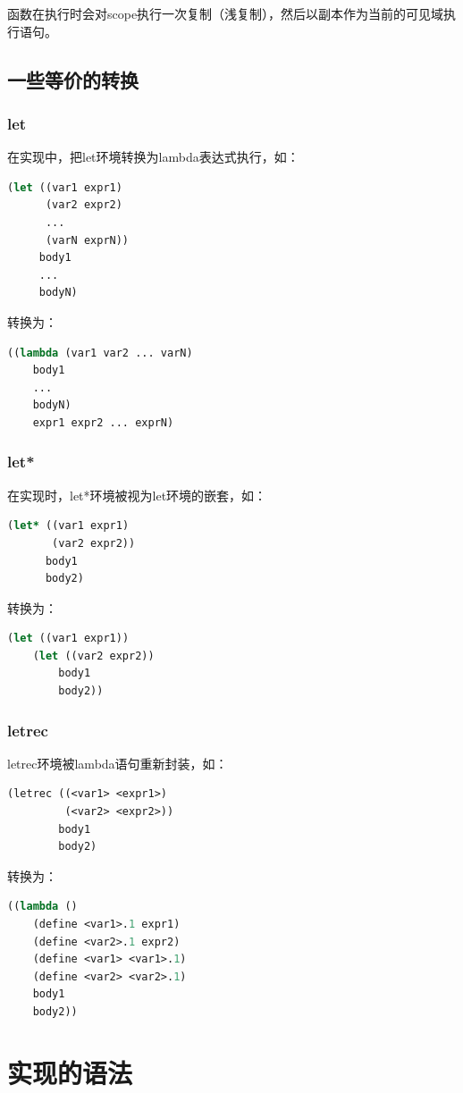 \documentclass[11pt, a4paper]{article}
\begin{document}
			函数在执行时会对scope执行一次复制（浅复制），然后以副本作为当前的可见域执行语句。
		\subsection{一些等价的转换}
			\subsubsection{let}
				在实现中，把let环境转换为lambda表达式执行，如：
\begin{lstlisting}[language=lisp]
(let ((var1 expr1)
      (var2 expr2)
      ...
      (varN exprN))
     body1
     ...
     bodyN)
\end{lstlisting}
转换为：
\begin{lstlisting}[language=lisp]
((lambda (var1 var2 ... varN)
	body1
	...
	bodyN)
	expr1 expr2 ... exprN)
\end{lstlisting}

			\subsubsection{let*}
				在实现时，let*环境被视为let环境的嵌套，如：
\begin{lstlisting}[language=lisp]
(let* ((var1 expr1)
       (var2 expr2))
      body1
      body2)
\end{lstlisting}
转换为：
\begin{lstlisting}[language=lisp]
(let ((var1 expr1))
	(let ((var2 expr2))
		body1
		body2))
\end{lstlisting}

			\subsubsection{letrec}
				letrec环境被lambda语句重新封装，如：
\begin{lstlisting}[language=lisp]
(letrec ((<var1> <expr1>)
         (<var2> <expr2>))
		body1
		body2)
\end{lstlisting}
转换为：
\begin{lstlisting}[language=lisp]
((lambda ()
	(define <var1>.1 expr1)
	(define <var2>.1 expr2)
	(define <var1> <var1>.1)
	(define <var2> <var2>.1)
	body1
	body2))
\end{lstlisting}

	\section{实现的语法}
\end{document}
